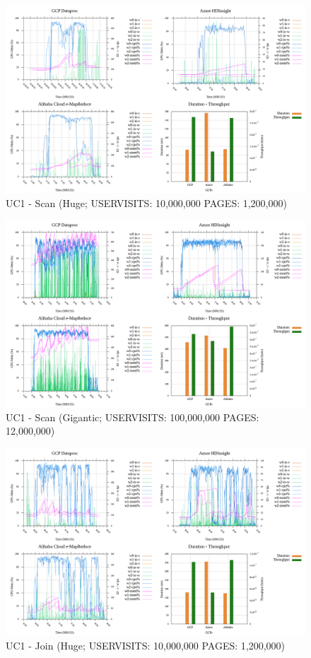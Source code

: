 \documentclass[review]{elsarticle}
\begin{document}
\begin{figure}[p]
	\caption{UC1 - Scan (Huge; USERVISITS: 10,000,000 PAGES: 1,200,000)}
	\label{fig:uc1-scan-h-cmidt}
	\includegraphics[width=\textwidth]{uc1-scan-h-cmidt}
	\centering
\end{figure}

\begin{figure}[p]
	\caption{UC1 - Scan (Gigantic; USERVISITS: 100,000,000 PAGES: 12,000,000)}
	\label{fig:uc1-scan-g-cmidt}
	\includegraphics[width=\textwidth]{uc1-scan-g-cmidt}
	\centering
\end{figure}

\begin{figure}[p]
	\caption{UC1 - Join (Huge; USERVISITS: 10,000,000 PAGES: 1,200,000)}
	\label{fig:uc1-join-h-cmidt}
	\includegraphics[width=\textwidth]{uc1-join-h-cmidt}
	\centering
\end{figure}
\end{document}
